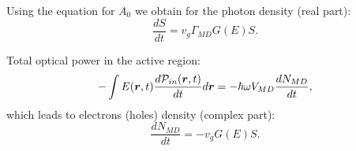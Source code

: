 Using the equation for $A_0$ we obtain for the photon density (real part):
\begin{equation}
	\frac{d S}{d t} = v_g \Gamma_{MD} G(E) S.
\end{equation}

Total optical power in the active region:
\begin{equation*}
	-\int E(\mbox{\boldmath $r$},t) \frac{d \mathcal{P}_{in}(\mbox{\boldmath $r$},t)}{d t} d \mbox{\boldmath $r$} = - \hbar \omega V_{MD} \frac{d N_{MD}}{d t},
\end{equation*}
which leads to electrons (holes) density (complex part):
\begin{equation}
	\frac{d N_{MD}}{d t} = - v_g G(E) S.
\end{equation}